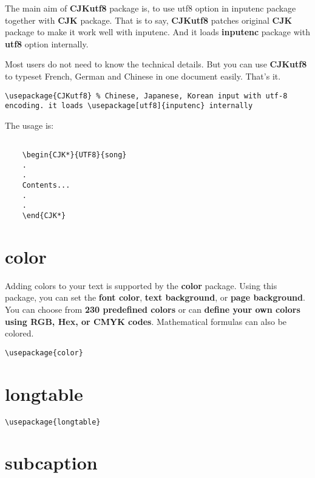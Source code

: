 The main aim of \textbf{CJKutf8} package is, to use utf8 option in inputenc package together with \textbf{CJK} package. That is to say, \textbf{CJKutf8} patches original \textbf{CJK} package to make it work well with inputenc. And it loads \textbf{inputenc} package with \textbf{utf8} option internally.

Most users do not need to know the technical details. But you can use \textbf{CJKutf8} to typeset French, German and Chinese in one document easily. That's it.

\begin{lstlisting}[language={[LaTeX]TeX}]
\usepackage{CJKutf8} % Chinese, Japanese, Korean input with utf-8 encoding. it loads \usepackage[utf8]{inputenc} internally
\end{lstlisting}

The usage is:

\begin{lstlisting}[language={[LaTeX]TeX}]

	\begin{CJK*}{UTF8}{song}
	.
	.
	Contents...
	.
	.
	\end{CJK*}

\end{lstlisting}

\section{color}
Adding colors to your text is supported by the \textbf{color} package. Using this package, you can set the \textbf{font color}, \textbf{text background}, or \textbf{page background}. You can choose from \textbf{230 predefined colors} or can \textbf{define your own colors using RGB, Hex, or CMYK codes}. Mathematical formulas can also be colored.

\begin{lstlisting}[language={[LaTeX]TeX}]
\usepackage{color}
\end{lstlisting}

\section{longtable}

\begin{lstlisting}[language={[LaTeX]TeX}]
\usepackage{longtable}
\end{lstlisting}

\section{subcaption}

